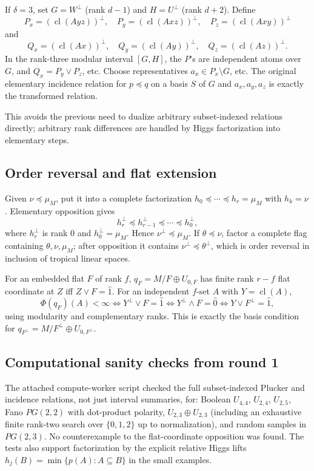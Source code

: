 \documentclass[12pt]{article}
\newcommand{\cl}{\operatorname{cl}}
\begin{document}
If $\delta=3$, set $G=W^\perp$ (rank $d-1$) and $H=U^\perp$ (rank
$d+2$).  Define
\[
P_x=(\cl(Ayz))^\perp,\quad P_y=(\cl(Axz))^\perp,\quad
P_z=(\cl(Axy))^\perp
\]
and
\[
Q_x=(\cl(Ax))^\perp,\quad Q_y=(\cl(Ay))^\perp,\quad
Q_z=(\cl(Az))^\perp.
\]
In the rank-three modular interval $[G,H]$, the $P$'s are independent
atoms over $G$, and $Q_x=P_y\vee P_z$, etc.  Choose representatives
$a_x\in P_x\setminus G$, etc.  The original elementary incidence
relation for $p\preceq q$ on a basis $S$ of $G$ and
$a_x,a_y,a_z$ is exactly the transformed relation.

This avoids the previous need to dualize arbitrary subset-indexed
relations directly; arbitrary rank differences are handled by Higgs
factorization into elementary steps.

\subsection*{Order reversal and flat extension}

Given $\nu\preceq\mu_M$, put it into a complete factorization
$h_0\preceq\cdots\preceq h_r=\mu_M$ with $h_k=\nu$.  Elementary
opposition gives
\[
h_r^\perp\preceq h_{r-1}^\perp\preceq\cdots\preceq h_0^\perp,
\]
where $h_r^\perp$ is rank $0$ and $h_0^\perp=\mu_M$.  Hence
$\nu^\perp\preceq\mu_M$.  If $\theta\preceq\nu$, factor a complete
flag containing $\theta,\nu,\mu_M$; after opposition it contains
$\nu^\perp\preceq\theta^\perp$, which is order reversal in inclusion
of tropical linear spaces.

For an embedded flat $F$ of rank $f$, $q_F=M/F\oplus U_{0,F}$ has
finite rank $r-f$ flat coordinate at $Z$ iff $Z\vee F=\hat1$.  For an
independent $f$-set $A$ with $Y=\cl(A)$,
\[
\Phi(q_F)(A)<\infty
\Longleftrightarrow Y^\perp\vee F=\hat1
\Longleftrightarrow Y^\perp\wedge F=\hat0
\Longleftrightarrow Y\vee F^\perp=\hat1,
\]
using modularity and complementary ranks.  This is exactly the basis
condition for $q_{F^\perp}=M/F^\perp\oplus U_{0,F^\perp}$.

\subsection*{Computational sanity checks from round 1}

The attached compute-worker script checked the full subset-indexed
Plucker and incidence relations, not just interval summaries, for:
Boolean $U_{4,4}$, $U_{2,4}$, $U_{2,5}$, Fano $PG(2,2)$ with
dot-product polarity, $U_{2,3}\oplus U_{2,3}$ (including an exhaustive
finite rank-two search over $\{0,1,2\}$ up to normalization), and
random samples in $PG(2,3)$.  No counterexample to the flat-coordinate
opposition was found.  The tests also support factorization by the
explicit relative Higgs lifts
$h_j(B)=\min\{p(A):A\subseteq B\}$ in the small examples.
\end{document}
